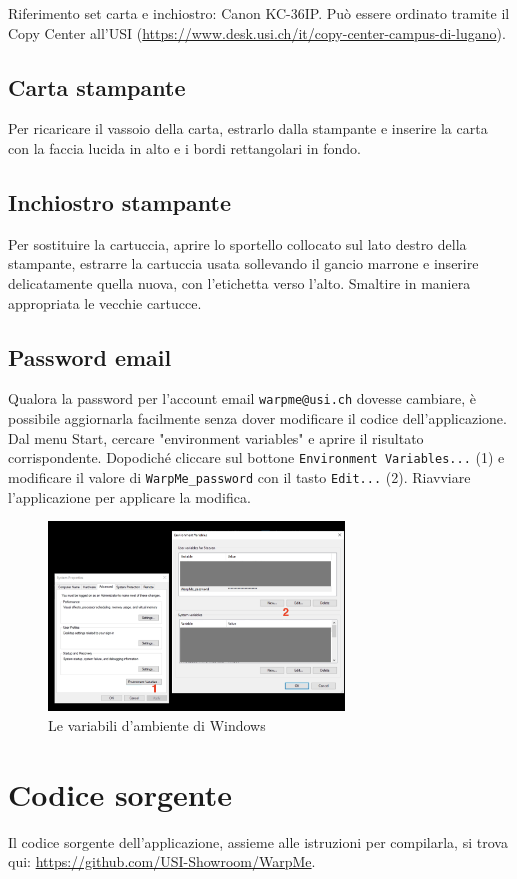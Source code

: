 \documentclass[12pt]{article}
\begin{document}
		Riferimento set carta e inchiostro: Canon KC-36IP. Può essere ordinato tramite il Copy Center all'USI (\url{https://www.desk.usi.ch/it/copy-center-campus-di-lugano}).
		

	\subsection{Carta stampante}		
		
		Per ricaricare il vassoio della carta, estrarlo dalla stampante e inserire la carta con la faccia lucida in alto e i bordi rettangolari in fondo.
		
		
	\subsection{Inchiostro stampante}
		
		Per sostituire la cartuccia, aprire lo sportello collocato sul lato destro della stampante, estrarre la cartuccia usata sollevando il gancio marrone e inserire delicatamente quella nuova, con l'etichetta verso l'alto. Smaltire in maniera appropriata le vecchie cartucce.

	\subsection{Password email}

		Qualora la password per l'account email \texttt{warpme@usi.ch} dovesse cambiare, è possibile
		aggiornarla facilmente senza dover modificare il codice dell'applicazione. Dal menu Start, cercare "environment variables" e aprire il risultato corrispondente.
		Dopodiché cliccare sul bottone \texttt{Environment Variables...} (1) e modificare il valore di \texttt{WarpMe\_password}
		con il tasto \texttt{Edit...} (2). Riavviare l'applicazione per applicare la modifica.

		\begin{figure}[H]
			\centering
			\includegraphics[width=0.7\textwidth]{img/env.png}
			\caption{Le variabili d'ambiente di Windows}
			\label{env}
	\end{figure}
		
		
		
\section{Codice sorgente}

	Il codice sorgente dell'applicazione, assieme alle istruzioni per compilarla, si trova qui: \url{https://github.com/USI-Showroom/WarpMe}.
		
	
\end{document}
